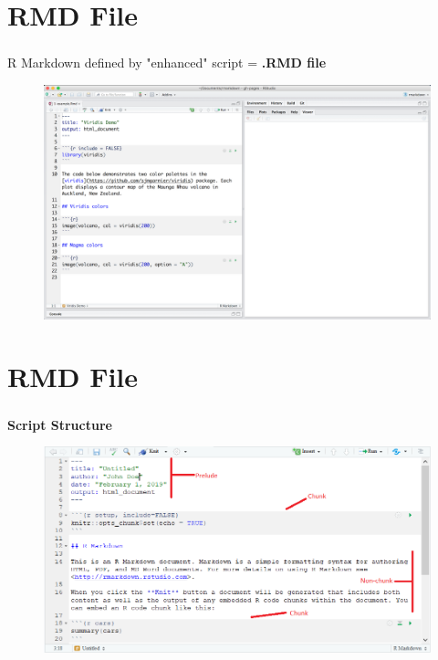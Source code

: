 \documentclass[xcolor=dvipsnames]{beamer}
\begin{document}
\section{RMD File}
\begin{frame}
\frametitle{\insertsectionhead}
R Markdown defined by "enhanced" script = \textbf{.RMD file}
\begin{figure}
\includegraphics[scale=0.4]{images/rmd_file_example.png}
\end{figure}
\end{frame}

\section{RMD File}
\begin{frame}
\frametitle{\insertsectionhead}
\textbf{Script Structure}
\begin{figure}
\includegraphics[scale=0.58]{images/Markdown_Ex.png}
\end{figure}
\end{frame}
\end{document}
